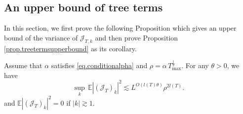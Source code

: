 \subsection{An upper bound of tree terms}\label{sec.treetermsupperbound} In this section, we first prove the following Proposition which gives an upper bound of the variance of $\mathcal{J}_{T,k}$ and then prove Proposition \ref{prop.treetermsupperbound} as its corollary.

\begin{prop}\label{prop.treetermsvariance}
Assume that $\alpha$ satisfies \eqref{eq.conditionalpha} and $\rho=\alpha\, T^{\frac{1}{2}}_{\text{max}}$. For any $\theta>0$, we have
\begin{equation}
    \sup_k\, \mathbb{E}|(\mathcal{J}_T)_k|^2\lesssim L^{O(l(T)\theta)} \rho^{2l(T)}.
\end{equation}
and $\mathbb{E}|(\mathcal{J}_T)_k|^2=0$ if $|k|\gtrsim 1$.
\end{prop}

